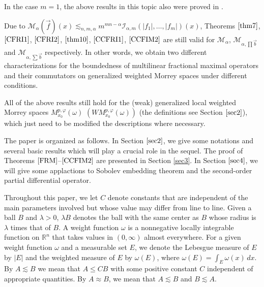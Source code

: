 \documentclass[11pt, twoside, leqno]{article}
\begin{document}
\begin{rem}
	In the case $m=1$, the above results in this topic also were proved in \cite{Gu8}.
\end{rem}

\begin{rem}
	Due to ${\mathcal{M}_\alpha }(\vec f)(x) { \lesssim _{n,m,\alpha }} {m^{mn - \alpha }}{\mathcal{I}_{\alpha,m}}(\left| {{f_1}} \right|, \ldots ,\left| {{f_m}} \right|)(x)$, Theorems $\ref{thm7}$, $\ref{CFRI1}$, $\ref{CFRI2}$, $\ref{thm10}$, $\ref{CCFRI1}$, $\ref{CCFIM2}$ are still valid for $\mathcal{M}_\alpha$, ${\mathcal{M}_{\alpha, \prod \vec b }}$ and ${{\mathcal M}_{\alpha ,\sum {\vec b} }}$ respectively. In other words, we obtain two different characterizations for the boundedness of multilinear fractional maximal operators and their commutators on generalized weighted Morrey spaces under different conditions.
\end{rem}

\begin{rem}
	All of the above results still hold for the (weak) generalized local weighted Morrey spaces $M_{{x_0}}^{p,\varphi }(\omega )$ $(WM_{{x_0}}^{p,\varphi }(\omega ))$ (the definitions see Section $\ref{sec2}$), which
	just need to be modified the descriptions where necessary.
\end{rem}

The paper is organized as follows. In Section $\ref{sec2}$, we give some notations and several basic results which will play a crucial role in the sequel. The proof of
Theorems $\ref{FRM}$--$\ref{CCFIM2}$  are presented in Section \ref{sec3}.  In Section $\ref{sec4}$, we will give some applactions to Sobolev embedding theorem and the second-order partial differential operator.

Throughout this paper, we let $C$ denote constants that are independent of the main parameters involved but whose value may differ from line to line. Given a ball $B$ and $\lambda>0$, $\lambda B$ denotes the ball with the same center as $B$ whose radius is $\lambda$ times that of $B$. A weight function $\omega$ is a nonnegative locally integrable function on $\mathbb R^n$ that takes values in $(0,\infty)$ almost everywhere. For a given weight function $\omega$ and a measurable set $E$, we denote the Lebesgue measure of $E$ by $|E|$ and the weighted measure of $E$ by $\omega(E)$, where $\omega(E)=\int_E \omega(x)\,dx$. By $A\lesssim B$ we mean that $A\leq CB$ with some positive constant $C$ independent of appropriate quantities. By $ A \approx B$, we mean that $A\lesssim B$ and $B\lesssim A$.
\end{document}
